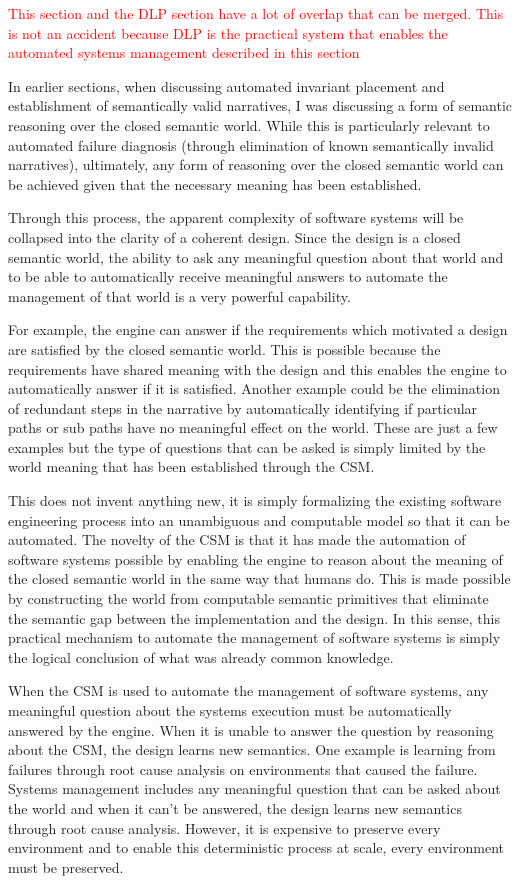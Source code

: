 \textcolor{red}{This section and the DLP section have a lot of overlap that can be merged. This is not an accident because DLP is the practical system that enables the automated systems management described in this section}

In earlier sections, when discussing automated invariant placement and establishment of semantically valid narratives, I was discussing a form of semantic reasoning over the closed semantic world. While this is particularly relevant to automated failure diagnosis (through elimination of known semantically invalid narratives), ultimately, any form of reasoning over the closed semantic world can be achieved given that the necessary meaning has been established. 

Through this process, the apparent complexity of software systems will be collapsed into the clarity of a coherent design. Since the design is a closed semantic world, the ability to ask any meaningful question about that world and to be able to automatically receive meaningful answers to automate the management of that world is a very powerful capability.

For example, the engine can answer if the requirements which motivated a design are satisfied by the closed semantic world. This is possible because the requirements have shared meaning with the design and this enables the engine to automatically answer if it is satisfied. Another example could be the elimination of redundant steps in the narrative by automatically identifying if particular paths or sub paths have no meaningful effect on the world. These are just a few examples but the type of questions that can be asked is simply limited by the world meaning that has been established through the CSM.

This does not invent anything new, it is simply formalizing the existing software engineering process into an unambiguous and computable model so that it can be automated. The novelty of the CSM is that it has made the automation of software systems possible by enabling the engine to reason about the meaning of the closed semantic world in the same way that humans do. This is made possible by constructing the world from computable semantic primitives that eliminate the semantic gap between the implementation and the design. In this sense, this practical mechanism to automate the management of software systems is simply the logical conclusion of what was already common knowledge. 

When the CSM is used to automate the management of software systems, any meaningful question about the systems execution must be automatically answered by the engine. When it is unable to answer the question by reasoning about the CSM, the design learns new semantics. One example is learning from failures through root cause analysis on environments that caused the failure. Systems management includes any meaningful question that can be asked about the world and when it can't be answered, the design learns new semantics through root cause analysis. However, it is expensive to preserve every environment and to enable this deterministic process at scale, every environment must be preserved.

